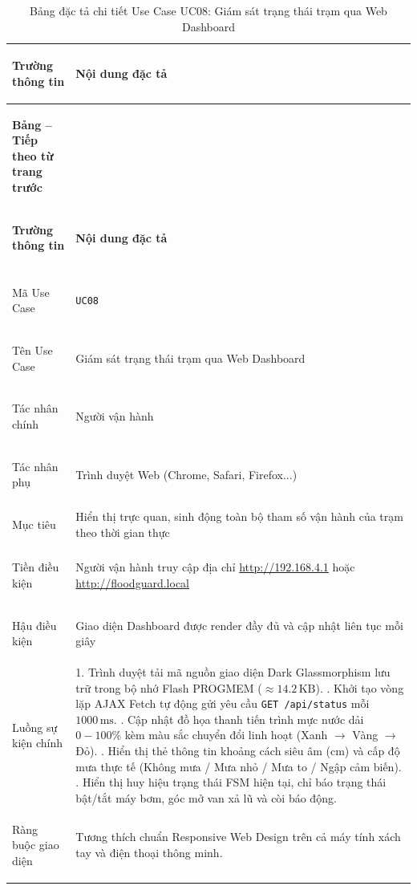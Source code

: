 \begin{xltabular}{\textwidth}{|>{\bfseries\raggedright\arraybackslash}p{3.2cm}|X|}
\caption{Bảng đặc tả chi tiết Use Case UC08: Giám sát trạng thái trạm qua Web Dashboard} \label{tab:spec_uc08} \\
\hline
\textbf{Trường thông tin} & \textbf{Nội dung đặc tả} \\ \hline
\endfirsthead

{{\bfseries Bảng \thetable{} -- Tiếp theo từ trang trước}} \\
\hline
\textbf{Trường thông tin} & \textbf{Nội dung đặc tả} \\ \hline
\endhead

\hline {} \\ \hline
\endfoot

\hline
\endlastfoot
Mã Use Case & \texttt{UC08} \\ \hline
Tên Use Case & Giám sát trạng thái trạm qua Web Dashboard \\ \hline
Tác nhân chính & Người vận hành \\ \hline
Tác nhân phụ & Trình duyệt Web (Chrome, Safari, Firefox...) \\ \hline
Mục tiêu & Hiển thị trực quan, sinh động toàn bộ tham số vận hành của trạm theo thời gian thực \\ \hline
Tiền điều kiện & Người vận hành truy cập địa chỉ \url{http://192.168.4.1} hoặc \url{http://floodguard.local} \\ \hline
Hậu điều kiện & Giao diện Dashboard được render đầy đủ và cập nhật liên tục mỗi giây \\ \hline
Luồng sự kiện chính & 
1. Trình duyệt tải mã nguồn giao diện Dark Glassmorphism lưu trữ trong bộ nhớ Flash PROGMEM ($\approx 14.2\,\text{KB}$). . Khởi tạo vòng lặp AJAX Fetch tự động gửi yêu cầu \texttt{GET /api/status} mỗi $1000\,\text{ms}$. . Cập nhật đồ họa thanh tiến trình mực nước dải $0 - 100\%$ kèm màu sắc chuyển đổi linh hoạt (Xanh $\to$ Vàng $\to$ Đỏ). . Hiển thị thẻ thông tin khoảng cách siêu âm (cm) và cấp độ mưa thực tế (Không mưa / Mưa nhỏ / Mưa to / Ngập cảm biến). . Hiển thị huy hiệu trạng thái FSM hiện tại, chỉ báo trạng thái bật/tắt máy bơm, góc mở van xả lũ và còi báo động. \\ \hline
Ràng buộc giao diện & Tương thích chuẩn Responsive Web Design trên cả máy tính xách tay và điện thoại thông minh. \\ \hline

\end{xltabular}
\endgroup

